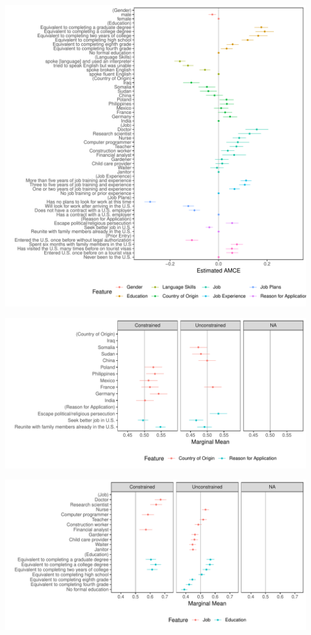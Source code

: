 \documentclass[a4paper,12pt]{article}\usepackage[]{graphicx}\usepackage[]{color}
\makeatletter
\def\maxwidth{ %
  \ifdim\Gin@nat@width>\linewidth
    \linewidth
  \else
    \Gin@nat@width
  \fi
}
\newenvironment{knitrout}{}{} %
\makeatother
\begin{document}
\begin{knitrout}
\color{fgcolor}
\includegraphics[width=\maxwidth]{figure/hainmueller_immigration_amce_appendix-1} 

\end{knitrout}

\clearpage

\begin{knitrout}
\color{fgcolor}
\includegraphics[width=\maxwidth]{figure/hainmueller_immigration_amce_appendix_split-1} 

\includegraphics[width=\maxwidth]{figure/hainmueller_immigration_amce_appendix_split-2} 

\end{knitrout}
\end{document}
